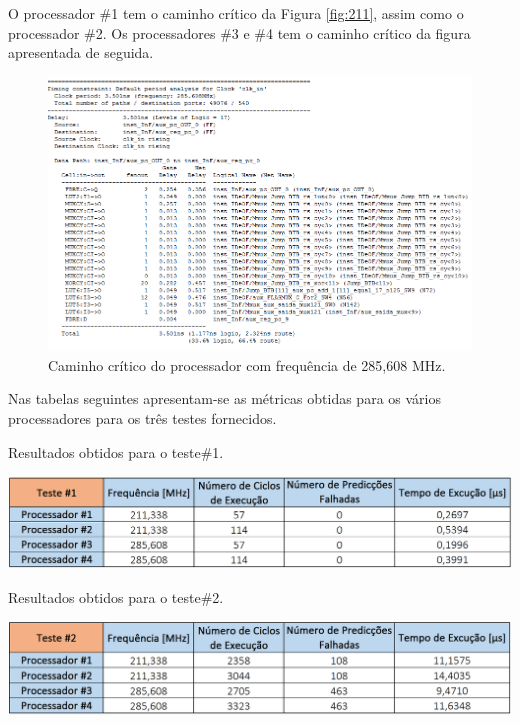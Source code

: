 \documentclass[11pt]{article}
\numberwithin{equation}{section}
\begin{document}
O processador \#1 tem o caminho crítico da Figura \ref{fig:211}, assim como o processador \#2. Os processadores \#3 e \#4 tem o caminho crítico da figura apresentada de seguida.

\begin{figure}[H]
	\centering
	\includegraphics[keepaspectratio=true, scale=0.35]{imagens/freq285}
	\vspace{-0.5em}
	\caption{Caminho crítico do processador com frequência de 285,608 MHz.}
	\label{fig:285}
	\vspace{-0.8em}
\end{figure} 

Nas tabelas seguintes apresentam-se as métricas obtidas para os vários processadores para os três testes fornecidos.

\begin{table}[H]
	\centering
	\caption{Resultados obtidos para o teste$\#$1.}
	\vspace{-1.5mm}
	\includegraphics[keepaspectratio=true, scale=0.40]{tabelas/teste1}
	\label{tab:teste1}
\end{table}

\begin{table}[H]
	\centering
	\caption{Resultados obtidos para o teste$\#$2.}
	\vspace{-1.5mm}
	\includegraphics[keepaspectratio=true, scale=0.40]{tabelas/teste2}
	\label{tab:teste2}
\end{table}
\end{document}
